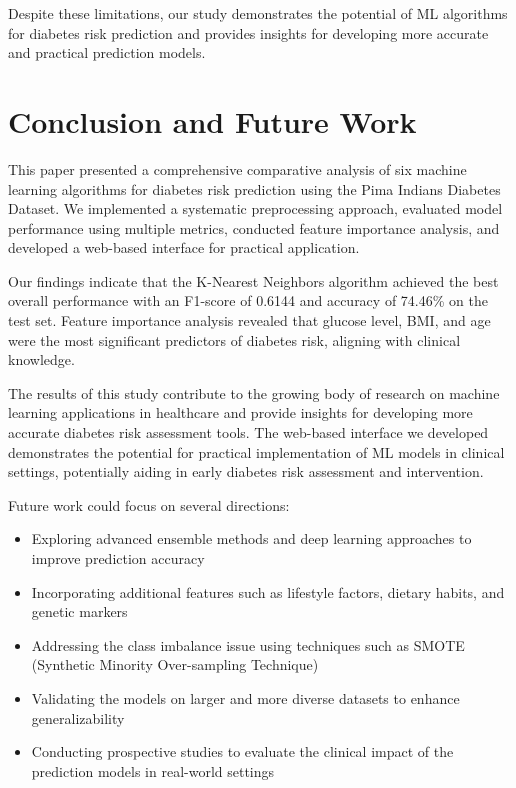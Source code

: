 \documentclass[conference]{IEEEtran}
\begin{document}
Despite these limitations, our study demonstrates the potential of ML algorithms for diabetes risk prediction and provides insights for developing more accurate and practical prediction models.

\section{Conclusion and Future Work}
This paper presented a comprehensive comparative analysis of six machine learning algorithms for diabetes risk prediction using the Pima Indians Diabetes Dataset. We implemented a systematic preprocessing approach, evaluated model performance using multiple metrics, conducted feature importance analysis, and developed a web-based interface for practical application.

Our findings indicate that the K-Nearest Neighbors algorithm achieved the best overall performance with an F1-score of 0.6144 and accuracy of 74.46\% on the test set. Feature importance analysis revealed that glucose level, BMI, and age were the most significant predictors of diabetes risk, aligning with clinical knowledge.

The results of this study contribute to the growing body of research on machine learning applications in healthcare and provide insights for developing more accurate diabetes risk assessment tools. The web-based interface we developed demonstrates the potential for practical implementation of ML models in clinical settings, potentially aiding in early diabetes risk assessment and intervention.

Future work could focus on several directions:

\begin{itemize}
    \item Exploring advanced ensemble methods and deep learning approaches to improve prediction accuracy
    \item Incorporating additional features such as lifestyle factors, dietary habits, and genetic markers
    \item Addressing the class imbalance issue using techniques such as SMOTE (Synthetic Minority Over-sampling Technique)
    \item Validating the models on larger and more diverse datasets to enhance generalizability
    \item Conducting prospective studies to evaluate the clinical impact of the prediction models in real-world settings
\end{itemize}
\end{document}
